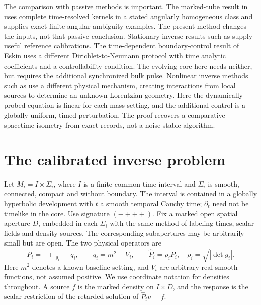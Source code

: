 \documentclass[11pt]{article}
\numberwithin{equation}{section}
\begin{document}
The comparison with passive methods is important. The marked-tube result in \cite{Archive33} uses complete time-resolved kernels in a stated angularly homogeneous class and supplies exact finite-angular ambiguity examples. The present method changes the inputs, not that passive conclusion. Stationary inverse results such as \cite{Saksala,Eskin} supply useful reference calibrations. The time-dependent boundary-control result of Eskin \cite[Theorem 1.2]{EskinDynamic} uses a different Dirichlet-to-Neumann protocol with time analytic coefficients and a controllability condition. The evolving core here needs neither, but requires the additional synchronized bulk pulse. Nonlinear inverse methods such as \cite{LUW} use a different physical mechanism, creating interactions from local sources to determine an unknown Lorentzian geometry. Here the dynamically probed equation is linear for each mass setting, and the additional control is a globally uniform, timed perturbation. The proof recovers a comparative spacetime isometry from exact records, not a noise-stable algorithm.

\section{The calibrated inverse problem}

Let \(M_i=I\times\Sigma_i\), where \(I\) is a finite common time interval and \(\Sigma_i\) is smooth, connected, compact and without boundary. The interval is contained in a globally hyperbolic development with \(t\) a smooth temporal Cauchy time; \(\partial_t\) need not be timelike in the core. Use signature \((-+++)\). Fix a marked open spatial aperture \(D\), embedded in each \(\Sigma_i\) with the same method of labeling times, scalar fields and density sources. The corresponding subapertures may be arbitrarily small but are open. The two physical operators are
\[
 P_i=-\Box_{g_i}+q_i,\qquad q_i=m^2+V_i,\qquad
 \widehat P_i=\rho_i P_i,\quad \rho_i=\sqrt{|\det g_i|}.
\]
Here \(m^2\) denotes a known baseline setting, and \(V_i\) are arbitrary real smooth functions, not assumed positive. We use coordinate notation for densities throughout. A source \(f\) is the marked density on \(I\times D\), and the response is the scalar restriction of the retarded solution of \(\widehat P_i u=f\).
\end{document}
